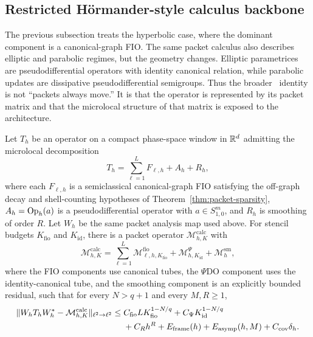 \subsection{Restricted H\"ormander-style calculus backbone}
\label{sec:unified-calculus}

The previous subsection treats the hyperbolic case, where the dominant component is a canonical-graph FIO.  The same packet calculus also describes elliptic and parabolic regimes, but the geometry changes.  Elliptic parametrices are pseudodifferential operators with identity canonical relation, while parabolic updates are dissipative pseudodifferential semigroups.  Thus the broader \MiNO\ identity is not ``packets always move.''  It is that the operator is represented by its packet matrix and that the microlocal structure of that matrix is exposed to the architecture.

\begin{theorem}
\label{thm:unified-fio-pdo-calculus}
Let $T_h$ be an operator on a compact phase-space window in $\mathbb R^d$ admitting the microlocal decomposition
\[
T_h=\sum_{\ell=1}^{L}F_{\ell,h}+A_h+R_h ,
\]
where each $F_{\ell,h}$ is a semiclassical canonical-graph FIO satisfying the off-graph decay and shell-counting hypotheses of Theorem~\ref{thm:packet-sparsity}, $A_h=\operatorname{Op}_h(a)$ is a pseudodifferential operator with $a\in S^m_{1,0}$, and $R_h$ is smoothing of order $R$.  Let $W_h$ be the same packet analysis map used above.  For stencil budgets $K_{\mathrm{fio}}$ and $K_{\mathrm{id}}$, there is a packet operator $\mathcal M_{h,K}^{\mathrm{calc}}$ with
\[
\mathcal M_{h,K}^{\mathrm{calc}}
=
\sum_{\ell=1}^{L}\mathcal M^{\mathrm{fio}}_{\ell,h,K_{\mathrm{fio}}}
+\mathcal M^{\Psi}_{h,K_{\mathrm{id}}}
+\mathcal M^{\mathrm{sm}}_{h},
\]
where the FIO components use canonical tubes, the $\Psi$DO component uses the identity-canonical tube, and the smoothing component is an explicitly bounded residual, such that for every $N>q+1$ and every $M,R\ge 1$,
\begin{align}
\label{eq:unified-calculus-bound}
\|W_hT_hW_h^\ast-\mathcal M_{h,K}^{\mathrm{calc}}\|_{\ell^2\to\ell^2}
\le{}&
C_{\mathrm{fio}}L K_{\mathrm{fio}}^{1-N/q}
+C_{\Psi} K_{\mathrm{id}}^{1-N/q}  \notag\\
&+C_Rh^R
+E_{\mathrm{frame}}(h)+E_{\mathrm{asymp}}(h,M)+C_{\mathrm{cov}}\delta_h .
\end{align}
\end{theorem}

